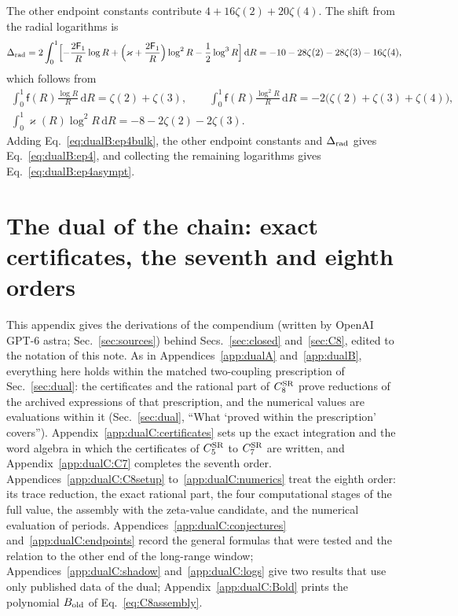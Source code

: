 \documentclass[11pt,a4paper]{article}
\numberwithin{equation}{section}
\newcommand{\dd}{\,\mathrm d}
\newcommand{\CSR}{C^{\rm SR}}
\begin{document}
The other endpoint constants contribute $4+16\zeta(2)+20\zeta(4)$. The shift from the radial logarithms is
\begin{equation}
 \Delta_{\rm rad}=2\int_0^1\Bigl[-\frac{2\mathsf F_1}{R}\log R+\Bigl(\varkappa+\frac{2\mathsf F_1}{R}\Bigr)\log^2R
 -\frac12\log^3R\Bigr]\dd R=-10-28\zeta(2)-28\zeta(3)-16\zeta(4),
\end{equation}
which follows from
\begin{equation}
\begin{gathered}
 \int_0^1\mathsf f(R)\frac{\log R}{R}\dd R=\zeta(2)+\zeta(3),\qquad
 \int_0^1\mathsf f(R)\frac{\log^2R}{R}\dd R=-2\bigl(\zeta(2)+\zeta(3)+\zeta(4)\bigr),\\
 \int_0^1\varkappa(R)\log^2R\dd R=-8-2\zeta(2)-2\zeta(3).
\end{gathered}
\end{equation}
Adding Eq.~\eqref{eq:dualB:ep4bulk}, the other endpoint constants and $\Delta_{\rm rad}$ gives
Eq.~\eqref{eq:dualB:ep4}, and collecting the remaining logarithms gives Eq.~\eqref{eq:dualB:ep4asympt}.

\section{The dual of the chain: exact certificates, the seventh and eighth orders}\label{app:dualC}
This appendix gives the derivations of the compendium (written by OpenAI GPT-6 astra; Sec.~\ref{sec:sources}) behind
Secs.~\ref{sec:closed} and~\ref{sec:C8}, edited to the notation of this note. As in Appendices~\ref{app:dualA}
and~\ref{app:dualB}, everything here holds within the matched two-coupling prescription of Sec.~\ref{sec:dual}: the
certificates and the rational part of $\CSR_8$ prove reductions of the archived expressions of that prescription, and
the numerical values are evaluations within it (Sec.~\ref{sec:dual}, ``What `proved within the prescription'
covers''). Appendix~\ref{app:dualC:certificates}
sets up the exact integration and the word algebra in which the certificates of $\CSR_5$ to $\CSR_7$ are written, and
Appendix~\ref{app:dualC:C7} completes the seventh order. Appendices~\ref{app:dualC:C8setup} to~\ref{app:dualC:numerics}
treat the eighth order: its trace reduction, the exact rational part, the four computational stages of the full
value, the assembly with the zeta-value candidate, and the numerical evaluation of periods.
Appendices~\ref{app:dualC:conjectures} and~\ref{app:dualC:endpoints} record the general formulas that were tested and
the relation to the other end of the long-range window; Appendices~\ref{app:dualC:shadow} and~\ref{app:dualC:logs} give two
results that use only published data of the dual; Appendix~\ref{app:dualC:Bold} prints the polynomial $B_{\rm old}$ of
Eq.~\eqref{eq:C8assembly}.
\end{document}
